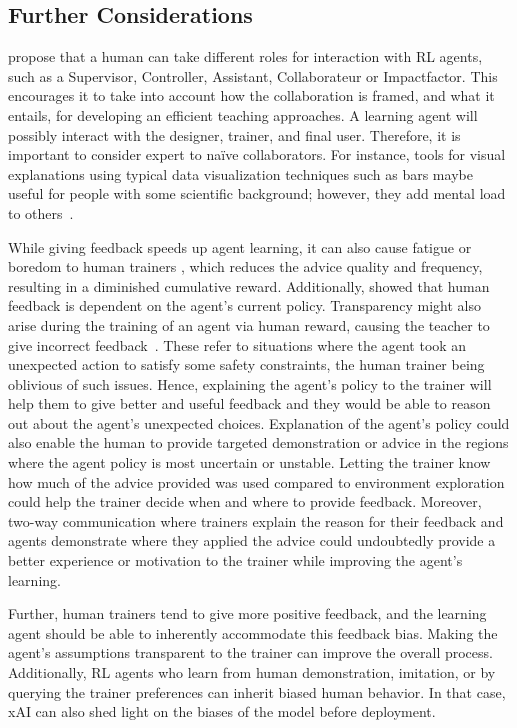 \documentclass[twoside,11pt]{article}
\begin{document}
\subsection{Further Considerations}
\citet{WuEtAl:2021:HITLMLSurvey} propose that a human can take different roles for interaction with RL agents, such as a Supervisor, Controller, Assistant, Collaborateur or Impactfactor. This encourages it to take into account how the collaboration is framed, and what it entails, for developing an efficient teaching approaches. A learning agent will possibly interact with the designer, trainer, and final user. Therefore, it is important to consider expert to na\"ive collaborators. For instance, tools for visual explanations using typical data visualization techniques such as bars maybe useful for people with some scientific background; however, they add mental load to others~\citep{anderson:20}. 
 
While giving feedback speeds up agent learning, it can also cause fatigue or boredom to human trainers \citep{akalin:21}, which reduces the advice quality and frequency, resulting in a diminished cumulative reward. Additionally, \citet{macglashan2017interactive} showed that human feedback is dependent on the agent’s current policy.  Transparency might also arise during the training of an agent via human reward, causing the teacher to give incorrect feedback~\citep{knox:13}. These refer to situations where the agent took an unexpected action to satisfy some safety constraints, the human trainer being oblivious of such issues. Hence, explaining the agent’s policy to the trainer will help them to give better and useful feedback and they would be able to reason out about the agent’s unexpected choices. Explanation of the agent’s policy could also enable the human to provide targeted demonstration or advice in the regions where the agent policy is most uncertain or unstable.  Letting the trainer know how much of the advice provided was used compared to environment exploration could help the trainer decide when and where to provide feedback. Moreover, two-way communication where trainers explain the reason for their feedback and agents demonstrate where they applied the advice could undoubtedly provide a better experience or motivation to the trainer while improving the agent’s learning. 

Further, human trainers tend to give more positive feedback, and the learning agent should be able to inherently accommodate this feedback bias. Making the agent's assumptions transparent to the trainer can improve the overall process. Additionally, RL agents who learn from human demonstration, imitation, or by querying the trainer preferences can inherit biased human behavior. In that case, xAI can also shed light on the biases of the model before deployment.
\end{document}
